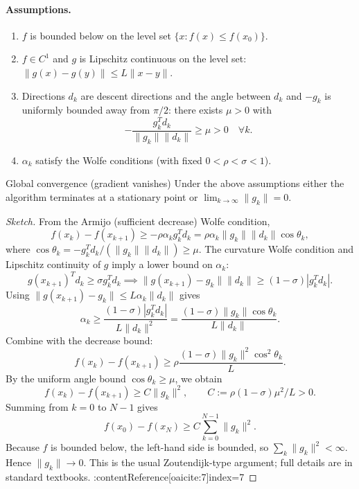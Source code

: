 \documentclass{MathNote}
\begin{document}
\paragraph{Assumptions.}
\begin{enumerate}
  \item \(f\) is bounded below on the level set \(\{x: f(x)\le f(x_0)\}\).
  \item \(f\in C^1\) and \(g\) is Lipschitz continuous on the level set: \(\|g(x)-g(y)\|\le L\|x-y\|\).
  \item Directions \(d_k\) are descent directions and the angle between \(d_k\) and \(-g_k\) is uniformly bounded away from \(\pi/2\): there exists \(\mu>0\) with
  \[
    -\frac{g_k^T d_k}{\|g_k\|\|d_k\|} \ge \mu >0\quad\forall k.
  \]
  \item \(\alpha_k\) satisfy the Wolfe conditions (with fixed \(0<\rho<\sigma<1\)).
\end{enumerate}

\begin{theorem}{Global convergence (gradient vanishes)}{}
Under the above assumptions either the algorithm terminates at a stationary point or \(\lim_{k\to\infty} \|g_k\| = 0\).
\end{theorem}

\begin{proof}[Sketch]
From the Armijo (sufficient decrease) Wolfe condition,
\[
f(x_k)-f(x_{k+1}) \ge -\rho\alpha_k g_k^T d_k = \rho\alpha_k \|g_k\|\|d_k\|\cos\theta_k,
\]
where \(\cos\theta_k = -g_k^T d_k / (\|g_k\|\|d_k\|) \ge \mu\). The curvature Wolfe condition and Lipschitz continuity of \(g\) imply a lower bound on \(\alpha_k\):
\[
g(x_{k+1})^T d_k \ge \sigma g_k^T d_k \implies \|g(x_{k+1})-g_k\|\|d_k\| \ge (1-\sigma)|g_k^T d_k|.
\]
Using \(\|g(x_{k+1})-g_k\|\le L\alpha_k\|d_k\|\) gives
\[
\alpha_k \ge \frac{(1-\sigma)|g_k^T d_k|}{L\|d_k\|^2} = \frac{(1-\sigma)\|g_k\|\cos\theta_k}{L\|d_k\|}.
\]
Combine with the decrease bound:
\[
f(x_k)-f(x_{k+1}) \ge \rho \frac{(1-\sigma)\|g_k\|^2\cos^2\theta_k}{L}.
\]
By the uniform angle bound \(\cos\theta_k\ge\mu\), we obtain
\[
f(x_k)-f(x_{k+1}) \ge C \|g_k\|^2,\qquad C:=\rho(1-\sigma)\mu^2/L>0.
\]
Summing from \(k=0\) to \(N-1\) gives
\[
f(x_0)-f(x_N)\ge C\sum_{k=0}^{N-1}\|g_k\|^2.
\]
Because \(f\) is bounded below, the left-hand side is bounded, so \(\sum_k\|g_k\|^2<\infty\). Hence \(\|g_k\|\to0\). This is the usual Zoutendijk-type argument; full details are in standard textbooks. :contentReference[oaicite:7]{index=7}
\end{proof}
\end{document}
